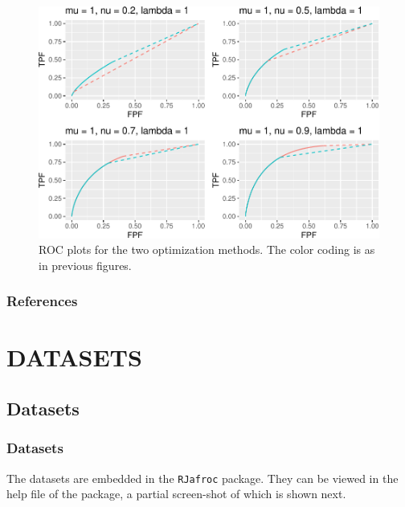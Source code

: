 \documentclass[
]{book}
\begin{document}
\begin{figure}
\centering
\includegraphics{21-optim-op-point_files/figure-latex/optim-op-point-low-performance-vary-nu-vary-all-roc-1.pdf}
\caption{\label{fig:optim-op-point-low-performance-vary-nu-vary-all-roc}ROC plots for the two optimization methods. The color coding is as in previous figures.}
\end{figure}

\hypertarget{optim-op-point-references}{%
\section{References}\label{optim-op-point-references}}

\hypertarget{part-datasets}{%
\part*{DATASETS}\label{part-datasets}}

\hypertarget{datasets}{%
\chapter{Datasets}\label{datasets}}

\hypertarget{datasets-datasets}{%
\section{Datasets}\label{datasets-datasets}}

The datasets are embedded in the \texttt{RJafroc} package. They can be viewed in the help file of the package, a partial screen-shot of which is shown next.
\end{document}
